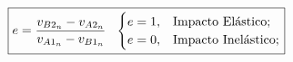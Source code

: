 \documentclass{article}
\begin{document}
\begin{enumerate}[noitemsep]
                        \begin{equation}
                            \boxed{
                                e = \frac{v_{B2_{n}} - v_{A2_{n}}}{v_{A1_{n}} - v_{B1_{n}}}
                                \hspace{2.5mm}
                                \begin{cases}
                                    e = 1, & \text{Impacto Elástico};\\
                                    e = 0, & \text{Impacto Inelástico};\\
                                \end{cases}
                            }
                        \end{equation}
                \end{enumerate}
\end{document}
